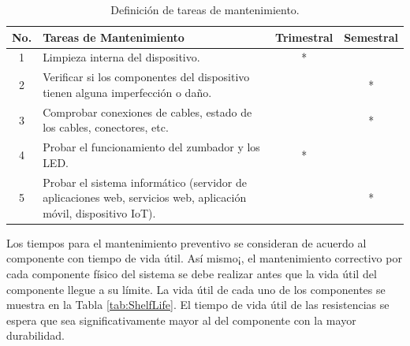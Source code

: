 \begin{table}[h]
\centering
\caption{Definición de tareas de mantenimiento.}
\label{tab:maintenance-tasks}
\begin{tabularx}{\textwidth}{cXcc}
	\toprule
	\textbf{No.} & \textbf{Tareas de Mantenimiento} & \textbf{Trimestral} & \textbf{Semestral} \\
	\midrule
	1 & Limpieza interna del dispositivo. & * & \\
	2 & Verificar si los componentes del dispositivo tienen alguna imperfección o daño. & & * \\
	3 & Comprobar conexiones de cables, estado de los cables, conectores, etc. & & * \\
	4 & Probar el funcionamiento del zumbador y los LED. & * & \\
	5 & Probar el sistema informático (servidor de aplicaciones web, servicios web, aplicación móvil, dispositivo IoT). & & * \\
	\bottomrule
\end{tabularx}
\end{table}
Los tiempos para el mantenimiento preventivo se consideran de acuerdo al componente con tiempo de vida útil. Así mismo¡, el mantenimiento correctivo por cada componente físico del sistema se debe realizar antes que la vida útil del componente llegue a su límite. La vida útil de cada uno de los componentes se muestra en la Tabla \ref{tab:ShelfLife}. El tiempo de vida útil de las resistencias se espera que sea significativamente mayor al del componente con la mayor durabilidad.

